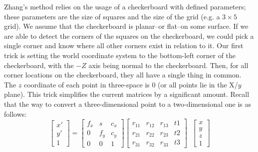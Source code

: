\documentclass[
    12pt,
    twoside,
    bibstyle=chicago,
    headerstyle=uppercase,
	bibfile=thesis.bib
]{reedthesis}
\begin{document}
Zhang's method relies on the usage of a checkerboard with defined parameters; these parameters are the size of squares and the size of the grid (e.g. a $3\times5$ grid). We assume that the checkerboard is planar--or flat--on some surface. If we are able to detect the corners of the squares on the checkerboard, we could pick a single corner and know where all other corners exist in relation to it. Our first trick is setting the world coordinate system to the bottom-left corner of the checkerboard, with the $-Z$ axis being normal to the checkerboard. Then, for all corner locations on the checkerboard, they all have a single thing in common. The $z$ coordinate of each point in three-space is 0 (or all points lie in the X/$y$ plane). This trick simplifies the current matrices by a significant amount. Recall that the way to convert a three-dimensional point to a two-dimensional one is as follows:
\[\begin{bmatrix}x' \\ y' \\ 1\end{bmatrix} = \begin{bmatrix}f_x & s & c_x \\ 0 & f_y & c_y \\ 0 & 0 & 1\end{bmatrix} \begin{bmatrix} r_{11}&r_{12}&r_{13}&t{1}\\r_{21}&r_{22}&r_{23}&t{2}\\r_{31}&r_{32}&r_{33}&t{3}\end{bmatrix}\;\;\begin{bmatrix}x \\ y \\ z \\ 1\end{bmatrix}\]

\end{document}
